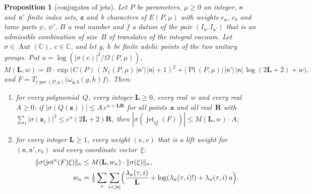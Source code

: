 \documentclass[11pt,a4paper]{article}
\newcommand{\m}[1]{\mbox{$#1$}}        %
\theoremstyle{plainx}
\newtheorem{proposition}[theorem]{Proposition}
\theoremstyle{uprightx}
\newcommand{\CC}{\mathbb{C}}
\newcommand{\ix}[1]{\mathsf{#1}}
\newcommand{\AutC}{\operatorname{Aut}(\CC)}
\newcommand{\EPm}{E(P,\mu)}
\newcommand{\PlPm}{\operatorname{Pl}(P,\mu)}
\newcommand{\NPm}{N_1(P,\mu)}
\begin{document}
\begin{proposition}[conjugates of jets]\label{p:jet}
Let $P$ be parameters, \m{\mu\ge0} an integer, \m{\ix n} and~\m{\ix n'} finite index sets, $\mathfrak{a}$ and~$b$ characters of
\m{\EPm} with weights $e_{\mathfrak{a}}$, $e_b$ and tame parts $\psi$, $\psi'$, $B$ a real number and $f$ a datum of the pair
\m{(I_{\ix n},I_{\ix n'})} that is an admissible combination of size~$B$ of translates of the integral vacuum. Let
\m{\sigma\in\AutC}, \m{c\in\CC}, and let $g$, $h$ be finite adelic points of the two unitary groups. Put
\m{u=\log(|\sigma(c)|^2/\Omega(P,\mu))},
\[M(\mathbf{L},w)=B\cdot\exp\bigl(C(P)\,(\NPm\,|\ix n'|\,|\ix n|+1)^2+|\PlPm|\,|\ix n'|\,|\ix n|\,\log(2\mathbf{L}+2)+w\bigr),\]
and \m{F=T_{c\operatorname{per}(P,\mu)}\bigl(\omega_{\mathfrak{a},b}(g,h)f\bigr)}. Then:
\begin{enumerate}[label=\textup{(\roman*)},leftmargin=2.3em,itemsep=2pt]
\item for every polynomial~$Q$, every integer \m{\mathbf{L}\ge0}, every real~$w$ and every real \m{A\ge0}: if
\m{|\sigma(Q(\mathbf{z}))|\le A\,e^{w+\mathbf{L}\mathbf{R}}} for all points~$\mathbf{z}$ and all real~$\mathbf{R}$ with
\m{\sum_i|\sigma(\mathbf{z}_i)|^2\le e^{u}(2\mathbf{L}+2)\mathbf{R}}, then \m{|\sigma(\operatorname{jet}_Q(F))|\le M(\mathbf{L},w)\cdot A};
\item for every integer \m{\mathbf{L}\ge1}, every weight \m{(\kappa,e)} that is a lift weight for \m{(\ix n,\ix n',e_b)} and
every coordinate vector~$\xi$:
\begin{align*}
\|\sigma(\operatorname{jet}^{\kappa}(F)\xi)\|_\kappa&\le M(\mathbf{L},w_\kappa)\cdot\|\sigma(\xi)\|_\kappa,\\
w_\kappa&=\tfrac12\sum_\tau\sum_{i<|\ix n|}\Bigl(\frac{\lambda_\kappa(\tau,i)}{\mathbf{L}}+\log(\lambda_\kappa(\tau,i)!)+\lambda_\kappa(\tau,i)\,u\Bigr).
\end{align*}
\end{enumerate}
\end{proposition}
\end{document}
